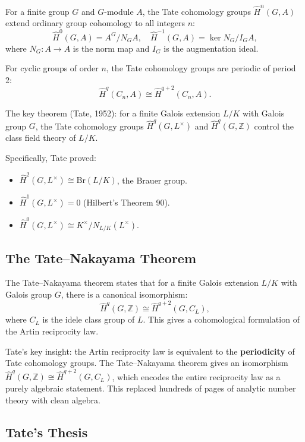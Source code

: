 For a finite group $G$ and $G$-module $A$, the Tate cohomology groups $\widehat H^n(G,A)$ extend ordinary group cohomology to all integers $n$:
\[
\widehat H^0(G,A) = A^G / N_G A, \quad \widehat H^{-1}(G,A) = \ker N_G / I_G A,
\]
where $N_G: A \to A$ is the norm map and $I_G$ is the augmentation ideal.

For cyclic groups of order $n$, the Tate cohomology groups are periodic of period 2:
\[
\widehat H^q(C_n, A) \cong \widehat H^{q+2}(C_n, A).
\]

The key theorem (Tate, 1952): for a finite Galois extension $L/K$ with Galois group $G$, the Tate cohomology groups $\widehat H^q(G, L^\times)$ and $\widehat H^q(G, \mathbb{Z})$ control the class field theory of $L/K$.

Specifically, Tate proved:
\begin{itemize}
\item $\widehat H^2(G, L^\times) \cong \mathrm{Br}(L/K)$, the Brauer group.
\item $\widehat H^1(G, L^\times) = 0$ (Hilbert's Theorem 90).
\item $\widehat H^0(G, L^\times) \cong K^\times / N_{L/K}(L^\times)$.
\end{itemize}

\subsection{The Tate--Nakayama Theorem}

The Tate--Nakayama theorem states that for a finite Galois extension $L/K$ with Galois group $G$, there is a canonical isomorphism:
\[
\widehat H^q(G, \mathbb{Z}) \cong \widehat H^{q+2}(G, C_L),
\]
where $C_L$ is the idele class group of $L$. This gives a cohomological formulation of the Artin reciprocity law.

\begin{bigidea}
Tate's key insight: the Artin reciprocity law is equivalent to the \textbf{periodicity} of Tate cohomology groups. The Tate--Nakayama theorem gives an isomorphism $\widehat H^q(G,\mathbb{Z}) \cong \widehat H^{q+2}(G,C_L)$, which encodes the entire reciprocity law as a purely algebraic statement. This replaced hundreds of pages of analytic number theory with clean algebra.
\end{bigidea}

\subsection{Tate's Thesis}

